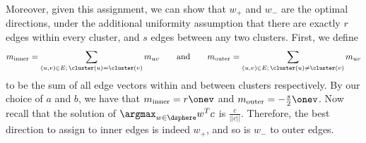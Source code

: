 Moreover, given this assignment, we can show that $w_+$ and $w_-$ are the optimal directions, under
the additional uniformity assumption that there are exactly $r$ edges within every cluster, and $s$
edges between any two clusters. First, we define
\begin{equation*}
  m_{\mathrm{inner}} = \sum_{(u,v) \in E;\, \cluster(u)=\cluster(v)} m_{uv} \qquad \text{and} \qquad
  m_{\mathrm{outer}} = \sum_{(u,v) \in E;\, \cluster(u)\neq \cluster(v)} m_{uv}
\end{equation*}
to be the sum of all edge vectors within and between clusters respectively. By our choice of $a$ and
$b$, we have that $m_{\mathrm{inner}} = r\onev$ and $m_{\mathrm{outer}} = -\frac{s}{2}\onev$. Now
recall that the solution of $\argmax_{w\in \dsphere} w^T c$ is $\frac{c}{||c||}$. Therefore, the
best direction to assign to inner edges is indeed $w_+$, and so is $w_-$ to outer edges.

